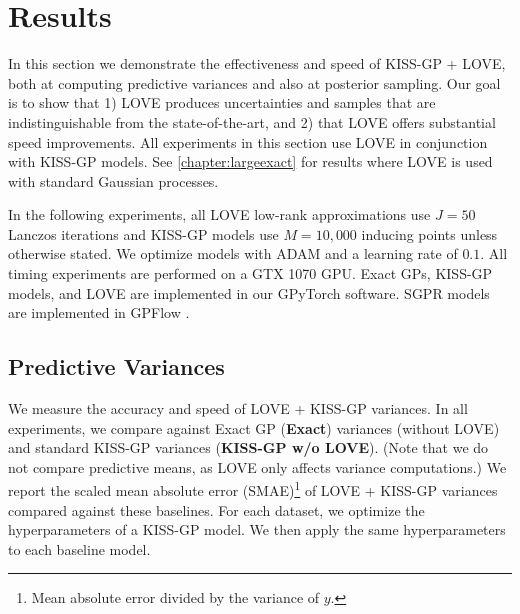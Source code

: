 \section{Results}
\label{sec:love_results}

In this section we demonstrate the effectiveness and speed of KISS-GP + LOVE{}, both at computing predictive variances and also at posterior sampling.
Our goal is to show that 1) LOVE{} produces uncertainties and samples that are indistinguishable from the state-of-the-art, and 2) that LOVE{} offers substantial speed improvements.
All experiments in this section use LOVE in conjunction with KISS-GP models.
See \cref{chapter:largeexact} for results where LOVE is used with standard Gaussian processes.

In the following experiments, all LOVE{} low-rank approximations use $J=50$ Lanczos iterations and KISS-GP models use $M\!=\!10,\!000$ inducing points unless otherwise stated.
We optimize models with ADAM \cite{kingma2014adam} and a learning rate of $0.1$.
All timing experiments are performed on a GTX 1070 GPU.
Exact GPs, KISS-GP models, and LOVE are implemented in our GPyTorch software.
SGPR models are implemented in GPFlow \cite{matthews2017gpflow}.

\subsection{Predictive Variances}
\label{sec:results_variances}

We measure the accuracy and speed of LOVE + KISS-GP{} variances.
In all experiments, we compare against Exact GP ({\bf Exact}) variances (without LOVE) and standard KISS-GP variances ({\bf KISS-GP w/o LOVE}).
(Note that we do not compare predictive means, as LOVE{} only affects variance computations.)
We report the scaled mean absolute error (SMAE)\footnote{
  Mean absolute error divided by the variance of $y$.
} \cite{rasmussen2006gaussian} of LOVE{} + KISS-GP variances compared against these baselines.
For each dataset, we optimize the hyperparameters of a KISS-GP model.
We then apply the same hyperparameters to each baseline model.

